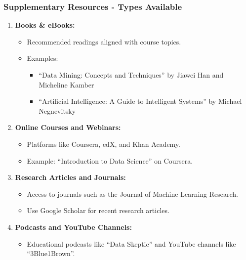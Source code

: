 \documentclass[aspectratio=169]{beamer}
\begin{document}
\begin{frame}[fragile]
    \frametitle{Supplementary Resources - Types Available}
    \begin{enumerate}
        \item \textbf{Books \& eBooks:}
            \begin{itemize}
                \item Recommended readings aligned with course topics.
                \item Examples: 
                    \begin{itemize}
                        \item ``Data Mining: Concepts and Techniques'' by Jiawei Han and Micheline Kamber
                        \item ``Artificial Intelligence: A Guide to Intelligent Systems'' by Michael Negnevitsky
                    \end{itemize}
            \end{itemize}

        \item \textbf{Online Courses and Webinars:}
            \begin{itemize}
                \item Platforms like Coursera, edX, and Khan Academy.
                \item Example: ``Introduction to Data Science'' on Coursera.
            \end{itemize}

        \item \textbf{Research Articles and Journals:}
            \begin{itemize}
                \item Access to journals such as the Journal of Machine Learning Research.
                \item Use Google Scholar for recent research articles.
            \end{itemize}

        \item \textbf{Podcasts and YouTube Channels:}
            \begin{itemize}
                \item Educational podcasts like ``Data Skeptic'' and YouTube channels like ``3Blue1Brown''.
            \end{itemize}
    \end{enumerate}
\end{frame}
\end{document}
